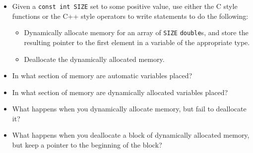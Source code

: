 \begin{itemize}

  \item Given a \texttt{const int SIZE} set to some positive value,
    use either the C style functions or the C++ style operators to write
    statements to do the following:
    \begin{itemize}
      \item Dynamically allocate memory for an array of \texttt{SIZE}
        \texttt{double}s, and store the resulting pointer to the first
        element in a variable of the appropriate type.
      \item Deallocate the dynamically allocated memory.
    \end{itemize}
    \vfill

  \item In what section of memory are automatic variables placed?
    \vfill

  \item In what section of memory are dynamically allocated variables placed?
    \vfill

  \item What happens when you dynamically allocate memory, but fail to
    deallocate it?
    \vfill

  \item What happens when you deallocate a block of dynamically allocated
    memory, but keep a pointer to the beginning of the block?
    \vfill

\end{itemize}



